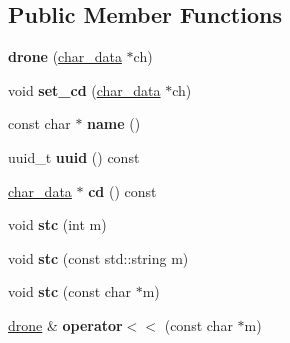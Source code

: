 \subsection*{Public Member Functions}
\begin{DoxyCompactItemize}
\item 
\mbox{\label{classmods_1_1drone_a0d81d963fd2f372b58e207b8a7533a26}} 
{\bfseries drone} (\hyperlink{structchar__data}{char\+\_\+data} $\ast$ch)
\item 
\mbox{\label{classmods_1_1drone_a93030541a987feba1e706d9bd62fd4f7}} 
void {\bfseries set\+\_\+cd} (\hyperlink{structchar__data}{char\+\_\+data} $\ast$ch)
\item 
\mbox{\label{classmods_1_1drone_a45904ed65afc4ecec95260b5a8f7b1e7}} 
const char $\ast$ {\bfseries name} ()
\item 
\mbox{\label{classmods_1_1drone_a4148b02ef73f30f56d14aec254f7aef4}} 
uuid\+\_\+t {\bfseries uuid} () const
\item 
\mbox{\label{classmods_1_1drone_a4bb187bc497218388891509e41dac0dc}} 
\hyperlink{structchar__data}{char\+\_\+data} $\ast$ {\bfseries cd} () const
\item 
\mbox{\label{classmods_1_1drone_aa1687dac040e3c54dbc0f921b6baf8c5}} 
void {\bfseries stc} (int m)
\item 
\mbox{\label{classmods_1_1drone_ab0e249ca1d9d9597301f6a723eff760b}} 
void {\bfseries stc} (const std\+::string m)
\item 
\mbox{\label{classmods_1_1drone_adb7111616e3b0ab36c8a332af2405cd1}} 
void {\bfseries stc} (const char $\ast$m)
\item 
\mbox{\label{classmods_1_1drone_a1a9203530e1cd10f9ebdc7bf0b23e8a5}} 
\hyperlink{classmods_1_1drone}{drone} \& {\bfseries operator$<$$<$} (const char $\ast$m)
\item 
\mbox{\label{classmods_1_1drone_a41b91ef279e3f3d4179d43d062fdb111}} 

\end{DoxyCompactItemize}
